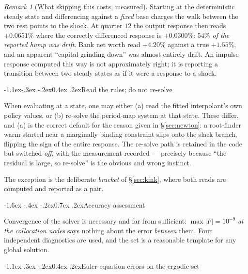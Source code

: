 \documentclass[10pt,a4paper]{article}
\makeatletter
\theoremstyle{definition}
\theoremstyle{plain}
\theoremstyle{remark}
\newtheorem{rem}[defn]{Remark}
\renewcommand\section{\@startsection{section}{1}{\z@}%
  {-1.6ex \@plus -.4ex \@minus -.2ex}{0.7ex \@plus.2ex}{\normalfont\large\bfseries}}
\renewcommand\subsection{\@startsection{subsection}{2}{\z@}%
  {-1.1ex\@plus -.3ex \@minus -.2ex}{0.4ex \@plus .2ex}{\normalfont\normalsize\bfseries}}
\makeatother
\begin{document}
\begin{rem}[What skipping this costs, measured]
Starting at the deterministic steady state and differencing against a \emph{fixed} base
charges the walk between the two rest points to the shock. At quarter $12$ the output response
then reads $+0.0651\%$ where the correctly differenced response is $+0.0300\%$: \emph{$54\%$
of the reported hump was drift}. Bank net worth read $+4.20\%$ against a true $+1.55\%$, and
an apparent ``capital grinding down'' was almost entirely drift. An impulse response computed
this way is not approximately right; it is reporting a transition between two steady states as
if it were a response to a shock.
\end{rem}

\subsection{Read the rules; do not re-solve}

When evaluating at a state, one may either (a) read the fitted interpolant's own policy
values, or (b) re-solve the period-map system at that state. These differ, and (a) is the
correct default for the reason given in \S\ref{sec:newton}: a root-finder warm-started near a
marginally binding constraint slips onto the slack branch, flipping the sign of the entire
response. The re-solve path is retained in the code but switched \emph{off}, with the
measurement recorded --- precisely because ``the residual is large, so re-solve'' is the
obvious and wrong instinct.

The exception is the deliberate \emph{bracket} of \S\ref{sec:kink}, where both reads are
computed and reported as a pair.

\section{Accuracy assessment}
\label{sec:accuracy}

Convergence of the solver is necessary and far from sufficient: $\max|F|=10^{-9}$ \emph{at the
collocation nodes} says nothing about the error \emph{between} them. Four independent
diagnostics are used, and the set is a reasonable template for any global solution.

\subsection{Euler-equation errors on the ergodic set}
\end{document}
